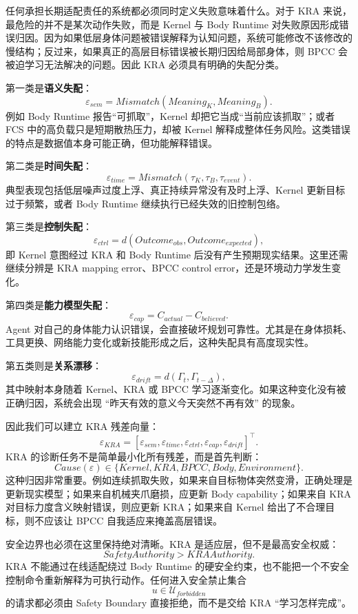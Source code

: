 任何承担长期适配责任的系统都必须同时定义失败意味着什么。对于 KRA 来说，最危险的并不是某次动作失败，而是 Kernel 与 Body Runtime 对失败原因形成错误归因。因为如果低层身体问题被错误解释为认知问题，系统可能修改不该修改的慢结构；反过来，如果真正的高层目标错误被长期归因给局部身体，则 BPCC 会被迫学习无法解决的问题。因此 KRA 必须具有明确的失配分类。

第一类是\textbf{语义失配}：
\[
\varepsilon_{sem}
=
Mismatch
\left(
Meaning_K,
Meaning_B
\right).
\]
例如 Body Runtime 报告``可抓取''，Kernel 却把它当成``当前应该抓取''；或者 FCS 中的高负载只是短期散热压力，却被 Kernel 解释成整体任务风险。这类错误的特点是数据值本身可能正确，但功能解释错误。

第二类是\textbf{时间失配}：
\[
\varepsilon_{time}
=
Mismatch
\left(
\tau_K,
\tau_B,
\tau_{event}
\right).
\]
典型表现包括低层噪声过度上浮、真正持续异常没有及时上浮、Kernel 更新目标过于频繁，或者 Body Runtime 继续执行已经失效的旧控制包络。

第三类是\textbf{控制失配}：
\[
\varepsilon_{ctrl}
=
d
\left(
Outcome_{obs},
Outcome_{expected}
\right),
\]
即 Kernel 意图经过 KRA 和 Body Runtime 后没有产生预期现实结果。这里还需继续分辨是 KRA mapping error、BPCC control error，还是环境动力学发生变化。

第四类是\textbf{能力模型失配}：
\[
\varepsilon_{cap}
=
C_{actual}
-
C_{believed}.
\]
Agent 对自己的身体能力认识错误，会直接破坏规划可靠性。尤其是在身体损耗、工具更换、网络能力变化或新技能形成之后，这种失配具有高度现实性。

第五类则是\textbf{关系漂移}：
\[
\varepsilon_{drift}
=
d
\left(
\Gamma_t,
\Gamma_{t-\Delta}
\right),
\]
其中映射本身随着 Kernel、KRA 或 BPCC 学习逐渐变化。如果这种变化没有被正确归因，系统会出现 ``昨天有效的意义今天突然不再有效'' 的现象。

因此我们可以建立 KRA 残差向量：
\[
\boxed{
\varepsilon_{KRA}
=
\left[
\varepsilon_{sem},
\varepsilon_{time},
\varepsilon_{ctrl},
\varepsilon_{cap},
\varepsilon_{drift}
\right]^{\top}.
}
\]
KRA 的诊断任务不是简单最小化所有残差，而是首先判断：
\[
Cause(\varepsilon)
\in
\{
Kernel,
KRA,
BPCC,
Body,
Environment
\}.
\]
这种归因非常重要。例如连续抓取失败，如果来自目标物体突然变滑，正确处理是更新现实模型；如果来自机械夹爪磨损，应更新 Body capability；如果来自 KRA 对目标力度含义映射错误，则应更新 KRA；如果来自 Kernel 给出了不合理目标，则不应该让 BPCC 自我适应来掩盖高层错误。

安全边界也必须在这里保持绝对清晰。KRA 是适应层，但不是最高安全权威：
\[
\boxed{
SafetyAuthority
>
KRAAuthority.
}
\]
KRA 不能通过在线适配绕过 Body Runtime 的硬安全约束，也不能把一个不安全控制命令重新解释为可执行动作。任何进入安全禁止集合
\[
u\in\mathcal U_{forbidden}
\]
的请求都必须由 Safety Boundary 直接拒绝，而不是交给 KRA ``学习怎样完成''。

